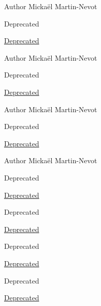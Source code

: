 \begin{DoxyAuthor}{Author}
Mickaël Martin-\/\+Nevot 
\end{DoxyAuthor}
\begin{DoxyRefDesc}{Deprecated}
\item[\hyperlink{deprecated__deprecated000008}{Deprecated}]\end{DoxyRefDesc}


\begin{DoxyAuthor}{Author}
Mickaël Martin-\/\+Nevot 
\end{DoxyAuthor}
\begin{DoxyRefDesc}{Deprecated}
\item[\hyperlink{deprecated__deprecated000009}{Deprecated}]\end{DoxyRefDesc}


\begin{DoxyAuthor}{Author}
Mickaël Martin-\/\+Nevot 
\end{DoxyAuthor}
\begin{DoxyRefDesc}{Deprecated}
\item[\hyperlink{deprecated__deprecated000010}{Deprecated}]\end{DoxyRefDesc}


\begin{DoxyAuthor}{Author}
Mickaël Martin-\/\+Nevot 
\end{DoxyAuthor}
\begin{DoxyRefDesc}{Deprecated}
\item[\hyperlink{deprecated__deprecated000011}{Deprecated}]\end{DoxyRefDesc}


\begin{DoxyRefDesc}{Deprecated}
\item[\hyperlink{deprecated__deprecated000012}{Deprecated}]\end{DoxyRefDesc}


\begin{DoxyRefDesc}{Deprecated}
\item[\hyperlink{deprecated__deprecated000013}{Deprecated}]\end{DoxyRefDesc}


\begin{DoxyRefDesc}{Deprecated}
\item[\hyperlink{deprecated__deprecated000014}{Deprecated}]\end{DoxyRefDesc}
